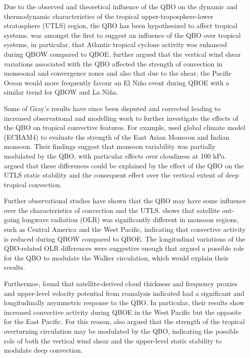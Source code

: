 Due to the observed and theoretical influence of the QBO on the dynamic and thermodynamic characteristics of the tropical upper-troposphere-lower stratosphere  (UTLS) region, the QBO has been hypothesized to affect tropical systems. 
\cite{gray1984} was amongst the first to suggest an influence of the QBO over tropical systems, in particular, that Atlantic tropical cyclone activity was enhanced during QBOW compared to QBOE. 
\cite{gray1992} further argued that the vertical wind shear variations associated with the QBO affected the strength of convection in monsoonal and convergence zones and also that due to the shear, the Pacific Ocean would more frequently favour an El Niño event during QBOE with a similar trend for QBOW and La Niña.

Some of Gray's results have since been disputed \citep[e.g.][]{chan1995,camargo2010} and corrected \citep{hansen2016tropospheric} leading to increased observational and modelling work to further investigate the effects of the QBO on tropical convective features. 
For example, \cite{giorgetta1999} used global climate model (ECHAM4) to evaluate the strength of the East Asian Monsoon and Indian monsoon. Their findings suggest that monsoon variability was partially modulated by the QBO, with particular effects over cloudiness at 100 hPa. \cite{giorgetta1999} argued that these differences could be explained by the effect of the QBO on the UTLS static stability and the consequent effect over the vertical extent of deep tropical convection. 

Further observational studies have shown that the QBO may have some influence over the characteristics of convection and the UTLS. \cite{collimore2003} shows that satellite out-going longwave radiation (OLR) was significantly different in monsoon regions, such as Central America  and the West Pacific, indicating that convective activity is reduced during QBOW compared to QBOE. 
The longitudinal variations of the QBO-related OLR differences were suggestive enough that \cite{collimore2003} argued a possible role for the QBO to modulate the Walker circulation, which would explain their results. 

Furthermoe, \cite{liess2012} found that satellite-derived cloud thickness and frequency proxies and upper-level velocity potential from reanalysis indicated had a significant and longitudinally asymmetric response to the QBO. In particular, their results show increased convective activity during QBOE in the West Pacific but the opposite for the East Pacific.  For this reason, \cite{liess2012} also argued that the strength of the tropical overturning circulation may be modulated by the QBO, indicating the possible role of both the vertical wind shear and the upper-level static stability to modulate deep convection. 


